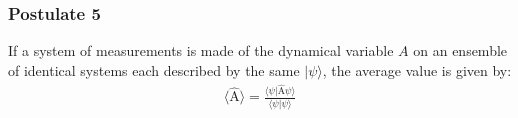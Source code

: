 \documentclass[a4paper]{article}
\newcommand{\operator}[1]{
  \ensuremath{\hat{\text{#1}}}}        %
\newcommand{\ave}[1]{
  \ensuremath{\langle #1 \rangle}}     %
\newcommand{\ket}[1]{
  \ensuremath{| #1 \rangle }}          %
\newcommand{\braket}[2]{
  \ensuremath{\langle #1|#2 \rangle }} %
\begin{document}
\begin{multicols*}{2}
\subsubsection{Postulate 5}
If a system of measurements is made of the dynamical variable $A$ on an ensemble of identical systems each described by the same $\ket{\psi}$, the average value is given by:
\begin{align*}
  \ave{\operator{A}} = \frac{\braket{\psi}{\operator{A} \psi}}{\braket{\psi}{\psi}}
\end{align*}
\end{multicols*}
\end{document}

